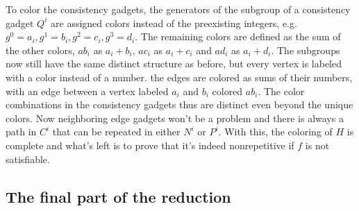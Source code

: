 \documentclass[12pt,a4paper]{article}
\begin{document}
\newline
To color the consistency gadgets, the generators of the subgroup of a consistency gadget $Q^i$ are assigned colors instead of the preexisting integers, e.g. $g^0 = a_i, g^1=b_i, g^2=c_i, g^3=d_i$. The remaining colors are defined as the sum of the other colors, $ab_i$ as $a_i + b_i$, $ac_i$ as $a_i + c_i$ and $ad_i$ as $a_i + d_i$. The subgroups now still have the same distinct structure as before, but every vertex is labeled with a color instead of a number. the edges are colored as sums of their numbers, with an edge between a vertex labeled $a_i$ and $b_i$ colored $ab_i$. The color combinations in the consistency gadgets thus are distinct even beyond the unique colors.
\newline
Now neighboring edge gadgets won't be a problem and there is always a path in $C^i$ that can be repeated in either $N^i$ or $P^i$. With this, the coloring of $H$ is complete and what's left is to prove that it's indeed nonrepetitive if $f$ is not satisfiable.

\subsection{The final part of the reduction}
\end{document}
